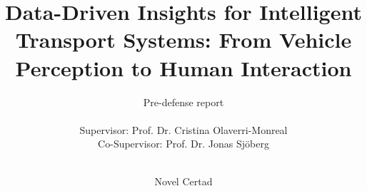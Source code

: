 \documentclass[a4paper,oneside,10pt,ngerman,english]{scrartcl}
\begin{document}

\title{Data-Driven Insights for Intelligent Transport Systems: From Vehicle Perception to Human Interaction}


\subtitle{Pre-defense report\\%
    \hfill\\%
    Supervisor: Prof. Dr. Cristina Olaverri-Monreal\\
    Co-Supervisor: Prof. Dr. Jonas Sj{\"o}berg\\
    \hfill\\%
}

\author{%
    Novel Certad
    \authornewline
    \authornewline
}





\end{document}

